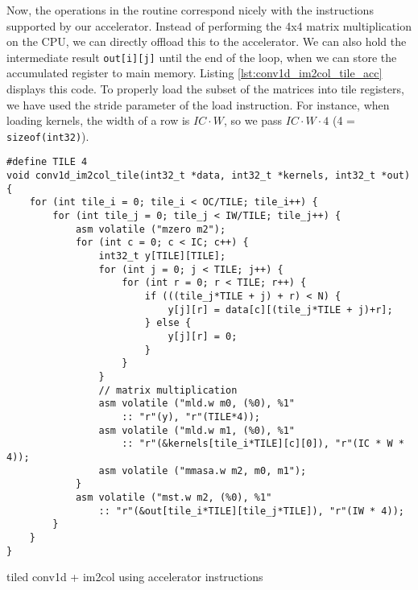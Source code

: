 \documentclass[acmsmall, nonacm=true]{acmart}
\begin{document}
Now, the operations in the routine correspond nicely with the instructions supported by our accelerator. Instead of performing the 4x4 matrix multiplication on the CPU, we can directly offload this to the accelerator. We can also hold the intermediate result \verb|out[i][j]| until the end of the loop, when we can store the accumulated register to main memory. Listing \ref{lst:conv1d_im2col_tile_acc} displays this code. To properly load the subset of the matrices into tile registers, we have used the stride parameter of the load instruction. For instance, when loading kernels, the width of a row is $IC\cdot W$, so we pass $IC\cdot W \cdot 4$ (4 = \verb|sizeof(int32)|).

\begin{listing}
    \centering
    \begin{verbatim}
#define TILE 4
void conv1d_im2col_tile(int32_t *data, int32_t *kernels, int32_t *out) {
    for (int tile_i = 0; tile_i < OC/TILE; tile_i++) {
        for (int tile_j = 0; tile_j < IW/TILE; tile_j++) {
            asm volatile ("mzero m2");
            for (int c = 0; c < IC; c++) {
                int32_t y[TILE][TILE];
                for (int j = 0; j < TILE; j++) {
                    for (int r = 0; r < TILE; r++) {
                        if (((tile_j*TILE + j) + r) < N) {
                            y[j][r] = data[c][(tile_j*TILE + j)+r];
                        } else {
                            y[j][r] = 0;
                        }                    
                    }
                }
                // matrix multiplication
                asm volatile ("mld.w m0, (%0), %1"
                    :: "r"(y), "r"(TILE*4));
                asm volatile ("mld.w m1, (%0), %1"
                    :: "r"(&kernels[tile_i*TILE][c][0]), "r"(IC * W * 4));
                asm volatile ("mmasa.w m2, m0, m1");
            }
            asm volatile ("mst.w m2, (%0), %1"
                :: "r"(&out[tile_i*TILE][tile_j*TILE]), "r"(IW * 4));
        }
    }
}
\end{verbatim}
    \caption{tiled conv1d + im2col using accelerator instructions}
    \label{lst:conv1d_im2col_tile_acc}
\end{listing}
\end{document}
